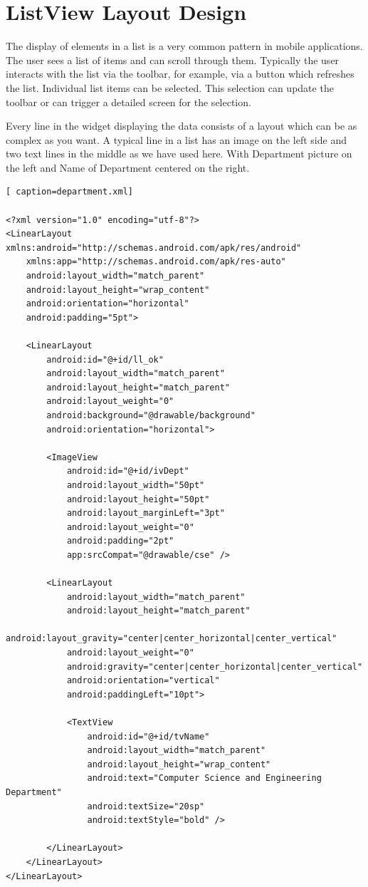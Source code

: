 \documentclass[11pt,a4paper]{report}
\begin{document}
\chapter{ListView Layout Design}

The display of elements in a list is a very common pattern in mobile applications. The user sees a list of items and can scroll through them. 
Typically the user interacts with the list via the toolbar, for example, via a button which refreshes the list. Individual list items can be selected. This selection can update the toolbar or can trigger a detailed screen for the selection. 


Every line in the widget displaying the data consists of a layout which can be as complex as you want. A typical line in a list has an image on the left side and two text lines in the middle as we have used here.
With Department picture on the left and Name of Department centered on the right.

\vspace{10pt}

\begin{lstlisting}[ caption=department.xml]

<?xml version="1.0" encoding="utf-8"?>
<LinearLayout xmlns:android="http://schemas.android.com/apk/res/android"
    xmlns:app="http://schemas.android.com/apk/res-auto"
    android:layout_width="match_parent"
    android:layout_height="wrap_content"
    android:orientation="horizontal"
    android:padding="5pt">

    <LinearLayout
        android:id="@+id/ll_ok"
        android:layout_width="match_parent"
        android:layout_height="match_parent"
        android:layout_weight="0"
        android:background="@drawable/background"
        android:orientation="horizontal">

        <ImageView
            android:id="@+id/ivDept"
            android:layout_width="50pt"
            android:layout_height="50pt"
            android:layout_marginLeft="3pt"
            android:layout_weight="0"
            android:padding="2pt"
            app:srcCompat="@drawable/cse" />

        <LinearLayout
            android:layout_width="match_parent"
            android:layout_height="match_parent"
            android:layout_gravity="center|center_horizontal|center_vertical"
            android:layout_weight="0"
            android:gravity="center|center_horizontal|center_vertical"
            android:orientation="vertical"
            android:paddingLeft="10pt">

            <TextView
                android:id="@+id/tvName"
                android:layout_width="match_parent"
                android:layout_height="wrap_content"
                android:text="Computer Science and Engineering Department"
                android:textSize="20sp"
                android:textStyle="bold" />

        </LinearLayout>
    </LinearLayout>
</LinearLayout>
\end{lstlisting}
\end{document}
